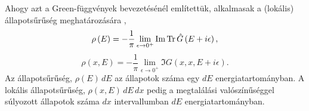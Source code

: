 Ahogy azt a Green-függvények bevezetésénél említettük, alkalmasak a (lokális) állapotsűrűség meghatározására \cite[7. o.]{economou2006green},
\begin{equation}
	\rho\left(E\right) = -\frac{1}{\pi}\lim_{\epsilon \to 0^+} \operatorname{Im}\operatorname{Tr}\hat{G}\left(E + i\epsilon\right),
	\label{green:densityeq}
\end{equation}
\begin{equation}
	\rho(x,E)=-\frac{1}{\pi}\lim_{\epsilon\to 0^+}\Im G(x,x,E+i\epsilon).
	\label{green:localdensityeq}
\end{equation}
Az állapotsűrűség, $\rho(E)\,dE$ az állapotok száma egy $dE$ energiatartományban. A lokális állapotsűrűség, $\rho(x,E)\,dE\,dx$ pedig a megtalálási valószínűséggel súlyozott állapotok száma $dx$ intervallumban $dE$ energiatartományban.

